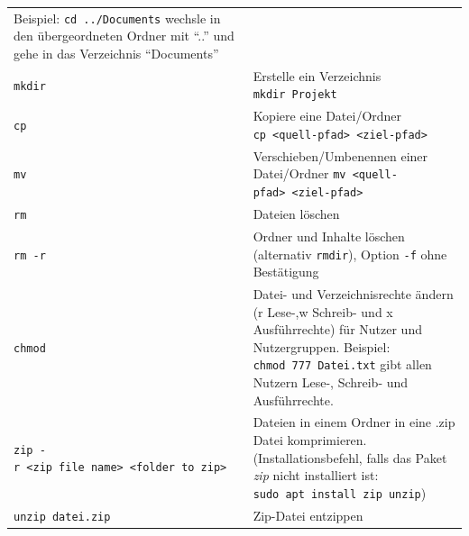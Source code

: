 \documentclass[
  11pt,
  a4paper,
  oneside, openany  ,captions=tableheading
]{scrbook}
\theoremstyle{remark}
\begin{document}
\begin{longtable}[]{@{}
  >{\raggedright\arraybackslash}p{}
  >{\raggedright\arraybackslash}p{}@{}}
Beispiel: \texttt{cd\ ../Documents} wechsle in den übergeordneten Ordner
mit ``..'' und gehe in das Verzeichnis ``Documents'' \\
\texttt{mkdir} & Erstelle ein Verzeichnis \texttt{mkdir\ Projekt} \\
\texttt{cp} & Kopiere eine Datei/Ordner
\texttt{cp\ \textless{}quell-pfad\textgreater{}\ \textless{}ziel-pfad\textgreater{}} \\
\texttt{mv} & Verschieben/Umbenennen einer Datei/Ordner
\texttt{mv\ \textless{}quell-pfad\textgreater{}\ \textless{}ziel-pfad\textgreater{}} \\
\texttt{rm} & Dateien löschen \\
\texttt{rm\ -r} & Ordner und Inhalte löschen (alternativ
\texttt{rmdir}), Option \texttt{-f} ohne Bestätigung \\
\texttt{chmod} & Datei- und Verzeichnisrechte ändern (r Lese-,w Schreib-
und x Ausführrechte) für Nutzer und Nutzergruppen. Beispiel:
\texttt{chmod\ 777\ Datei.txt} gibt allen Nutzern Lese-, Schreib- und
Ausführrechte. \\
\texttt{zip\ -r\ \textless{}zip\ file\ name\textgreater{}\ \textless{}folder\ to\ zip\textgreater{}}
& Dateien in einem Ordner in eine .zip Datei komprimieren.
(Installationsbefehl, falls das Paket \emph{zip} nicht installiert ist:
\texttt{sudo\ apt\ install\ zip\ unzip}) \\
\texttt{unzip\ datei.zip} & Zip-Datei entzippen \\
\end{longtable}
\end{document}
